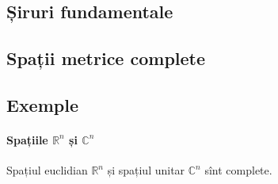 \documentclass[a4paper,12pt]{article}
\theoremstyle{change}
\begin{document}
\subsection{Șiruri fundamentale}


\subsection{Spații metrice complete}

\subsection{Exemple}

\paragraph{Spațiile $\mathbb{R}^n$ și $\mathbb{C}^n$} Spațiul euclidian $\mathbb{R}^n$ și spațiul unitar $\mathbb{C}^n$ sînt complete.
\end{document}
